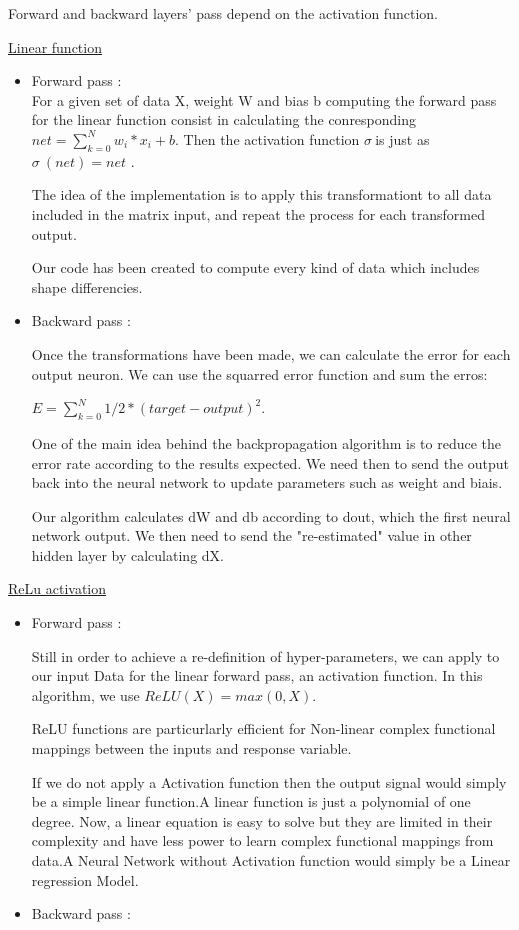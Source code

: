 Forward and backward layers' pass depend on the activation function.  

\underline{Linear function}
\begin{itemize}
\item Forward pass : \\
For a given set of data X, weight W and bias b computing the forward pass for the linear function consist in calculating the conresponding  $net = \sum_{k=0}^{N} w_i * x_i + b $.
Then the activation function $\sigma\ $is just as $\sigma\ (net) = net$ .

The idea of the implementation is to apply this transformationt to all data included in the matrix input, and repeat the process for each transformed output. 

Our code has been created to compute every kind of data which includes shape differencies.



\item Backward pass :

Once the transformations have been made, we can calculate the error for each output neuron. We can use the squarred error function and sum the erros:

$E = \sum_{k=0}^{N} 1/2*(target - output)^2$.

One of the main idea behind the backpropagation algorithm is to reduce the error rate according to the results expected. We need then to send the output back into the neural network to update parameters such as weight and biais. 

Our algorithm calculates dW and db according to dout, which the first neural network output.
We then need to send the "re-estimated" value in other hidden layer by calculating dX.

\end{itemize}

\underline{ReLu activation}
\begin{itemize}
\item Forward pass :

Still in order to achieve a re-definition of hyper-parameters, we can apply to our input Data for the linear forward pass, an activation function. In this algorithm, we use $ReLU(X) = max(0,X)$.

ReLU functions are particurlarly efficient for Non-linear complex functional mappings between the inputs and response variable.

If we do not apply a Activation function then the output signal would simply be a simple linear function.A linear function is just a polynomial of one degree. Now, a linear equation is easy to solve but they are limited in their complexity and have less power to learn complex functional mappings from data.A Neural Network without Activation function would simply be a Linear regression Model.

\item Backward pass :
\end{itemize}
